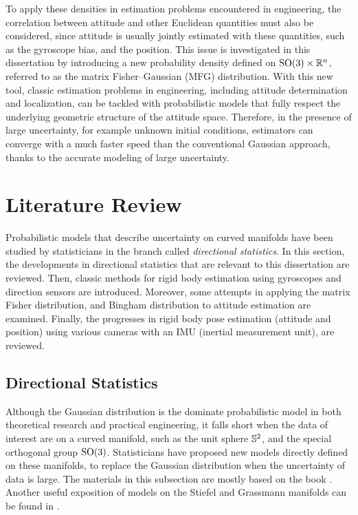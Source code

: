 To apply these densities in estimation problems encountered in engineering, the correlation between attitude and other Euclidean quantities must also be considered, since attitude is usually jointly estimated with these quantities, such as the gyroscope bias, and the position.
This issue is investigated in this dissertation by introducing a new probability density defined on $\mathrm{SO}(3) \times \mathbb{R}^n$, referred to as the matrix Fisher--Gaussian (MFG) distribution.
With this new tool, classic estimation problems in engineering, including attitude determination and localization, can be tackled with probabilistic models that fully respect the underlying geometric structure of the attitude space.
Therefore, in the presence of large uncertainty, for example unknown initial conditions, estimators can converge with a much faster speed than the conventional Gaussian approach, thanks to the accurate modeling of large uncertainty.

\section{Literature Review}

Probabilistic models that describe uncertainty on curved manifolds have been studied by statisticians in the branch called \textit{directional statistics}.
In this section, the developments in directional statistics that are relevant to this dissertation are reviewed.
Then, classic methods for rigid body estimation using gyroscopes and direction sensors are introduced.
Moreover, some attempts in applying the matrix Fisher distribution, and Bingham distribution to attitude estimation are examined.
Finally, the progresses in rigid body pose estimation (attitude and position) using various cameras with an IMU (inertial measurement unit), are reviewed.

\subsection{Directional Statistics} \label{section:intro-review-direction}

Although the Gaussian distribution is the dominate probabilistic model in both theoretical research and practical engineering, it falls short when the data of interest are on a curved manifold, such as the unit sphere $\mathbb{S}^2$, and the special orthogonal group $\mathrm{SO}(3)$.
Statisticians have proposed new models directly defined on these manifolds, to replace the Gaussian distribution when the uncertainty of data is large.
The materials in this subsection are mostly based on the book \cite{mardia2009directional}.
Another useful exposition of models on the Stiefel and Grassmann manifolds can be found in \cite{chikuse2003statistics}.

